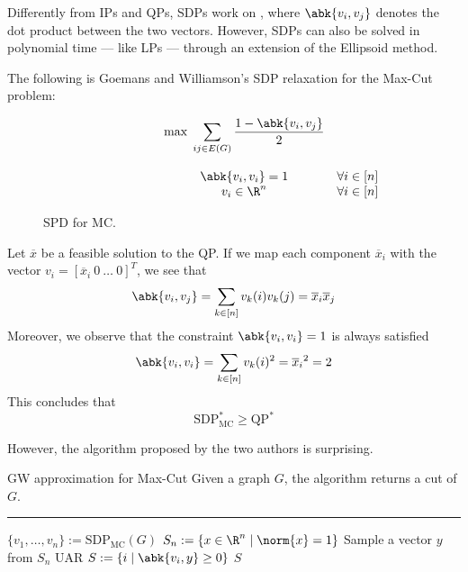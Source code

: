 \documentclass[a4paper, 12pt]{report}
\begin{document}
    Differently from IPs and QPs, SDPs work on , where $\abk{v_i, v_j}$ denotes the dot product between the two vectors. However, SDPs can also be solved in polynomial time --- like LPs --- through an extension of the Ellipsoid method.

    The following is Goemans and Williamson's SDP relaxation for the Max-Cut problem:

    \begin{figure}[H]
        \centering
        \[\begin{array}{ccl}
            \qquad\qquad\quad
            & \max \; \displaystyle \sum_{ij \in E(G)}{\dfrac{1 - \abk{v_i, v_j}}{2}} \\\\
            & \abk{v_i, v_i} = 1 & \forall i \in [n] \\
            & v_i \in \R^n & \forall i \in [n] \\
        \end{array}\]
        \caption{SPD for MC.}
    \end{figure}

    Let $\overline x$ be a feasible solution to the QP. If we map each component $\overline x_i$ with the vector $v_i = [\overline x_i \ 0 \ \ldots \ 0]^T$, we see that $$\abk{v_i, v_j} = \sum_{k \in [n]}{v_{k}(i)v_k(j)} = \overline x_i \overline x_j$$ Moreover, we observe that  the constraint $\abk{v_i, v_i} = 1$ is always satisfied $$\abk{v_i, v_i} = \sum_{k \in [n]}{v_k(i)^2} = {\overline x_i}^2 = 2$$ This concludes that $$\mathrm{SDP}^*_\mathrm{MC} \ge \mathrm{QP}^*$$

    However, the algorithm proposed by the two authors is  surprising.

    \begin{framedalgo}{GW approximation for Max-Cut}
        Given a graph $G$, the algorithm returns a cut of $G$. \\
        \hrule

        \quad
        \begin{algorithmic}[1]
                \State $\{v_1, \ldots, v_n\} := \mathrm{SDP}_\mathrm{MC}(G)$
                \State $S_n := \{x \in \R^n \mid \norm{x} = 1\}$ 
                \State Sample a vector $y$ from $S_n$ UAR
                \State $S := \{i \mid \abk{v_i, y} \ge 0\}$
                \State {} $S$
            \EndFunction
        \end{algorithmic}
    \end{framedalgo}
\end{document}
